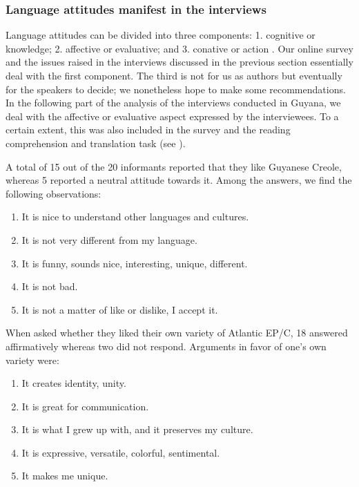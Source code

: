 \documentclass[output=paper,colorlinks,citecolor=brown]{langscibook}
\begin{document}
\subsubsection{Language attitudes manifest in the interviews}

Language attitudes can be divided into three components: 1. cognitive or knowledge; 2. affective or evaluative; and 3. conative or action \citep[139]{Agheyisi_Fishman_1970}. Our online survey and the issues raised in the interviews discussed in the previous section essentially deal with the first component. The third is not for us as authors but eventually for the speakers to decide; we nonetheless hope to make some recommendations. In the following part of the analysis of the interviews conducted in Guyana, we deal with the affective or evaluative aspect expressed by the interviewees. To a certain extent, this was also included in the survey and the reading comprehension and translation task (see ).

A total of 15 out of the 20 informants reported that they like Guyanese Creole, whereas 5 reported a neutral attitude towards it. Among the answers, we find the following observations:

\begin{enumerate}
    \item It is nice to understand other languages and cultures. 
    \item It is not very different from my language.
    \item It is funny, sounds nice, interesting, unique, different.
    \item It is not bad.
    \item It is not a matter of like or dislike, I accept it.
\end{enumerate}

When asked whether they liked their own variety of Atlantic EP/C, 18 answered affirmatively whereas two did not respond. Arguments in favor of one’s own variety were:

\begin{enumerate}
    \item It creates identity, unity.
    \item It is great for communication.
    \item It is what I grew up with, and it preserves my culture.
    \item It is expressive, versatile, colorful, sentimental.
    \item It makes me unique.
\end{enumerate}
\end{document}
